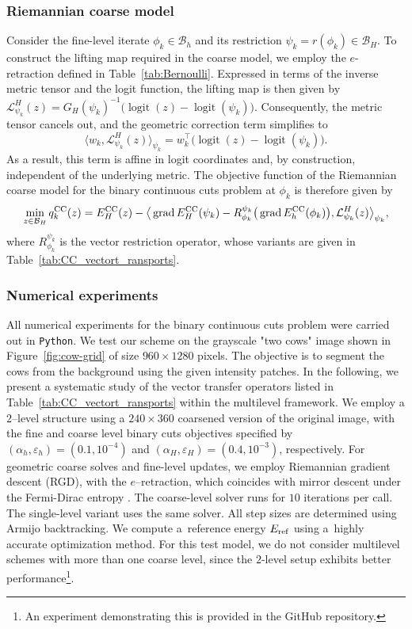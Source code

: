 \documentclass[11pt,reqno]{amsart}
\theoremstyle{plain}
\DeclareMathOperator{\grad}{grad}
\DeclareMathOperator{\logit}{logit}
\newcommand\calB{\mathcal B}
\newcommand{\invRet}{\mathcal L}
\newcommand{\CC}{{\rm CC}}
\begin{document}
		\subsubsection{Riemannian coarse model} 
		Consider the fine-level iterate $\phi_k\in\calB_h$ and its restriction \mbox{$\psi_k=r(\phi_k)\in\calB_H$}. 
		To construct the lifting map required in the coarse model, we employ the $e$-retraction defined in Table~\ref{tab:Bernoulli}.
		Expressed in terms of the inverse metric tensor and the logit function, the lifting map is then given by $\invRet_{\psi_k}^H(z) = G_H(\psi_k)^{-1}\big(\logit(z) - \logit(\psi_k)\big)$. Consequently, the metric tensor cancels out, and the geometric correction term simplifies to
		\begin{equation*}
			\big\langle w_k, \invRet^H_{\psi_k}(z) \big\rangle_{\psi_k} = w_k^\top \big( \logit(z) - \logit(\psi_k) \big).    
		\end{equation*}
		As a result, this term is affine in logit coordinates and, by construction, independent of the underlying metric. 
		The objective function of the Riemannian coarse model for the binary continuous cuts problem at $\phi_k$ is therefore given by
		\[
		\min_{z \in \calB_H} q_k^{\CC}(z) = E^{\CC}_H(z) - \big\langle \grad E^{\CC}_H(\psi_k) - R_{\phi_k}^{\psi_k} \big(\grad E^{\CC}_h(\phi_k)\big) , \invRet^H_{\psi_k}(z) \big\rangle_{\psi_k},
		\]
		where $R_{\phi_k}^{\psi_k}$ is the vector restriction operator, whose variants are given in Table~\ref{tab:CC_vectort_ransports}.
		
		\subsubsection{Numerical experiments}
		All numerical experiments for the binary continuous cuts problem were carried out in {\tt Python}. We test our scheme on the grayscale "two cows" image shown in Figure~\ref{fig:cow-grid} of size $960 \times 1280$ pixels. The objective is to segment the cows from the background using the given intensity patches. In the following, we present a systematic study of the vector transfer operators listed in Table~\ref{tab:CC_vectort_ransports} within the multilevel framework. We employ a $2$--level structure using a $240 \times 360$ coarsened version of the original image, with the fine and coarse level binary cuts objectives specified by $(\alpha_h, \varepsilon_h) = (0.1, 10^{-4}) $ and $(\alpha_H, \varepsilon_H) = (0.4, 10^{-3})$, respectively. For geometric coarse solves and fine-level updates, we employ Riemannian gradient descent (RGD), with the $e$--retraction, which coincides with mirror descent under the Fermi-Dirac entropy \cite{Raskutti2015,Raus2024}.  The coarse-level solver runs for $10$ iterations per call. The single-level variant uses the same solver. All step sizes are determined using Armijo backtracking. We compute a~reference energy $E_{\rm ref}$ using a~highly accurate optimization method. For this test model, we do not consider multilevel schemes with more than one coarse level, since the $2$-level setup exhibits better performance\footnote{An experiment demonstrating this is provided in the GitHub repository.}.
		
\end{document}
